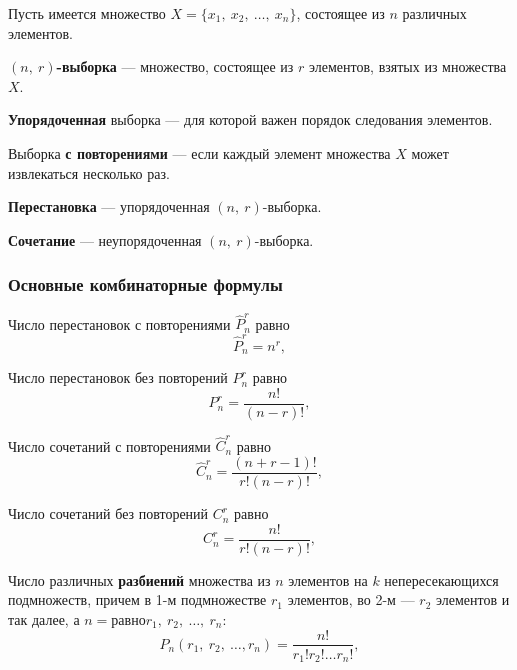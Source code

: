 \documentclass[a4paper]{article}
\newcommand{\rep}[1]{\widehat{#1}}
\newcommand{\key}[1]{{\color{Medium}\bfseries #1}}
\begin{document}
                Пусть имеется множество $X = \{ x_1 , \: x_2 , \: \ldots , \: x_n \}$, состоящее из $n$ различных элементов.

                \key{\boldmath$(n, \: r)$-выборка} --- множество, состоящее из $r$ элементов, взятых из множества $X$.

                \key{Упорядоченная} выборка --- для которой важен порядок следования элементов.

                Выборка \key{с повторениями} --- если каждый элемент множества $X$ может извлекаться несколько раз.

                \key{Перестановка} --- упорядоченная $(n, \: r)$-выборка.

                \key{Сочетание} --- неупорядоченная $(n, \: r)$-выборка.

            \subsubsection{Основные комбинаторные формулы}

                Число перестановок с повторениями $\rep{P }^r_n$ равно
                \begin{equation*}
                    \rep{P }^r_n = n^r ,
                \end{equation*}
                
                Число перестановок без повторений $P ^r_n$ равно
                \begin{equation*}
                    P ^r_n = \frac{n!}{(n - r)!} ,
                \end{equation*}

                Число сочетаний с повторениями $\rep{C}^r_n$ равно
                \begin{equation*}
                    \rep{C}^r_n = \frac{(n + r - 1)!}{r! (n - r)!} ,
                \end{equation*}

                Число сочетаний без повторений $C^r_n$ равно
                \begin{equation*}
                    C^r_n = \frac{n!}{r! (n - r)!} ,
                \end{equation*}

                Число различных \key{разбиений} множества из $n$ элементов на $k$ непересекающихся подмножеств, причем в 1-м подмножестве $r_1$ элементов, во 2-м --- $r_2$ элементов и так далее, а $n = равно r_1 , \: r_2 , \: \ldots , \: r_n $:
                \begin{equation*}
                    P_n(r_1 , \: r_2 , \: \ldots , r_n) = \frac{n!}{r_1! r_2! \ldots r_n!} ,
                \end{equation*}
\end{document}
